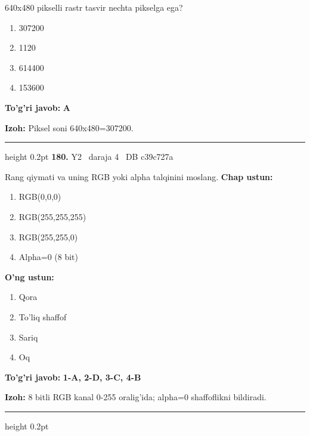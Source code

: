 \documentclass[10pt,a4paper,oneside]{article}
\begin{document}
\par
640x480 pikselli rastr tasvir nechta pikselga ega?
\begin{enumerate}[label=\Alph*),leftmargin=9mm]
\item 307200
\item 1120
\item 614400
\item 153600
\end{enumerate}
\begin{tcolorbox}[enhanced,breakable,colback=teal!4,colframe=teal!45!black,boxrule=0.45pt,arc=1.2mm,left=2.8mm,right=2.8mm,top=2mm,bottom=2mm,before skip=2mm,after skip=2mm]
\textbf{\color{teal}To'g'ri javob:} \textbf{A}
\par\smallskip
\textbf{Izoh:} Piksel soni 640x480=307200.
\end{tcolorbox}
\vspace{2mm}\hrule height 0.2pt \vspace{4mm}
\hypertarget{q180}{\textbf{\color{ink}180.}}  {\color{muted}\scriptsize Y2 \textbullet\ daraja 4 \textbullet\ DB c39c727a}
\par
Rang qiymati va uning RGB yoki alpha talqinini moslang.
\textbf{\footnotesize Chap ustun:}
\begin{enumerate}[label=\arabic*),leftmargin=9mm]
\item RGB(0,0,0)
\item RGB(255,255,255)
\item RGB(255,255,0)
\item Alpha=0 (8 bit)
\end{enumerate}
\textbf{\footnotesize O'ng ustun:}
\begin{enumerate}[label=\Alph*),leftmargin=9mm]
\item Qora
\item To'liq shaffof
\item Sariq
\item Oq
\end{enumerate}
\begin{tcolorbox}[enhanced,breakable,colback=teal!4,colframe=teal!45!black,boxrule=0.45pt,arc=1.2mm,left=2.8mm,right=2.8mm,top=2mm,bottom=2mm,before skip=2mm,after skip=2mm]
\textbf{\color{teal}To'g'ri javob:} \textbf{1-A, 2-D, 3-C, 4-B}
\par\smallskip
\textbf{Izoh:} 8 bitli RGB kanal 0-255 oralig'ida; alpha=0 shaffoflikni bildiradi.
\end{tcolorbox}
\vspace{2mm}\hrule height 0.2pt \vspace{4mm}
\end{document}
